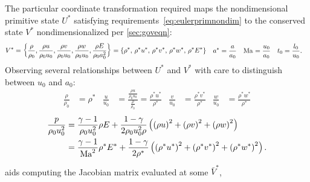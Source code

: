 The particular coordinate transformation required maps the
nondimensional primitive state $U^*$ satisfying
requirements~\eqref{eq:eulerprimnondim} to the conserved state $V^*$
nondimensionalized per \autoref{sec:goveqn}:
\begin{subequations}
\begin{align}
\label{eq:eulerconsnondim}
V^{*}
&= \left\{
  \frac{\rho}{\rho_0},
  \frac{\rho u}{\rho_0 u_0},
  \frac{\rho v}{\rho_0 u_0},
  \frac{\rho w}{\rho_0 u_0},
  \frac{\rho E}{\rho_0 a_0^2}
\right\}
= \left\{
    \rho^{*},
  \,\rho^{*} u^{*},
  \,\rho^{*} v^{*},
  \,\rho^{*} w^{*},
  \,\rho^{*} E^{*}
\right\}
\end{align}
\begin{align}
a^{*} &= \frac{a}{a_0}
&
\Mach &= \frac{u_0}{a_0}
&
t_0 &= \frac{l_0}{u_0}.
\end{align}
\end{subequations}
Observing several relationships between $U^*$ and $V^*$ with care to
distinguish between $u_0$ and $a_0$:
\begin{align}
  \frac{\rho}{\rho_0} &= \rho^*
&
  \frac{u}{u_0} &=
  \frac{\frac{\rho{}u}{\rho_0u_0}}{\frac{\rho}{\rho_0}}
  =
  \frac{\rho^{*}u^{*}}{\rho^{*}}
&
  \frac{v}{u_0} &= \frac{\rho^{*}v^*}{\rho^*}
&
  \frac{w}{u_0} &= \frac{\rho^{*}w^*}{\rho^*}
\end{align}
\begin{align}
 \frac{p}{\rho_0 u_0^2}
&=
   \frac{\gamma-1}{\rho_0 u_0^2} \rho E
 + \frac{1-\gamma}{2 \rho_0 u_0^2 \rho}\left(
           \left(\rho{}u\right)^2
         + \left(\rho{}v\right)^2
         + \left(\rho{}w\right)^2
   \right)
\notag\\
&=
   \frac{\gamma-1}{\mbox{Ma}_{}^2} \rho^{*} E^{*}
 + \frac{1-\gamma}{2 \rho^{*}}\left(
           \left(\rho^{*}u^{*}\right)^2
         + \left(\rho^{*}v^{*}\right)^2
         + \left(\rho^{*}w^{*}\right)^2
     \right).
\end{align}
aids computing the Jacobian matrix evaluated at some $\bar{V}^{*}$,
